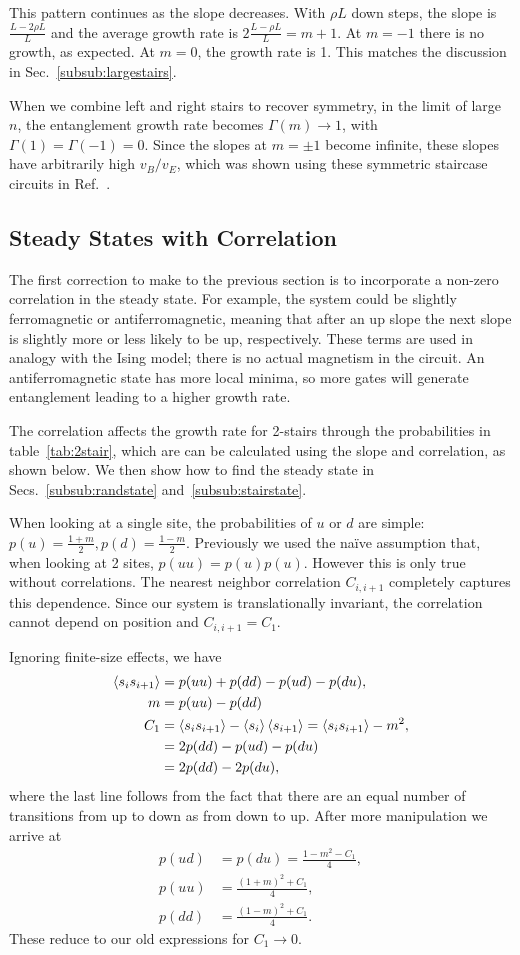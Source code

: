 This pattern continues as the slope decreases. With $\rho L$ down steps, the slope is $\frac{L-2\rho L}{L}$ and the average growth rate is $2\frac{L-\rho L}{L} = m+1$. At $m = -1$ there is no growth, as expected. At $m=0$, the growth rate is 1. This matches the discussion in Sec.~\ref{subsub:largestairs}.

When we combine left and right stairs to recover symmetry, in the limit of large $n$, the entanglement growth rate becomes $\Gamma(m)\to 1$, with $\Gamma(1) = \Gamma(-1)=0$. Since the slopes at $m=\pm1$ become infinite, these slopes have arbitrarily high $v_B/v_E$, which was shown using these symmetric staircase circuits in Ref.~\cite{Nahum2018}.

\subsection{Steady States with Correlation} \label{sub:steadystate}

The first correction to make to the previous section is to incorporate a non-zero correlation in the steady state. For example, the system could be slightly ferromagnetic or antiferromagnetic, meaning that after an up slope the next slope is slightly more or less likely to be up, respectively. These terms are used in analogy with the Ising model; there is no actual magnetism in the circuit. An antiferromagnetic state has more local minima, so more gates will generate entanglement leading to a higher growth rate.

The correlation affects the growth rate for 2-stairs through the probabilities in table~\ref{tab:2stair}, which are can be calculated using the slope and correlation, as shown below. We then show how to find the steady state in Secs.~\ref{subsub:randstate} and~\ref{subsub:stairstate}.

When looking at a single site, the probabilities of $u$ or $d$ are simple: $p(u) = \frac{1+m}{2}, p(d) = \frac{1-m}{2}$. Previously we used the na\"ive assumption that, when looking at 2 sites, $p(uu) = p(u)p(u)$. However this is only true without correlations. The nearest neighbor correlation $C_{i,i+1}$ completely captures this dependence. Since our system is translationally invariant, the correlation cannot depend on position and $C_{i,i+1}=C_1$.

Ignoring finite-size effects, we have
\begin{align}
\left\langle s_is_{i+1} \right\rangle &= p(uu) + p(dd) - p(ud) - p(du),\nonumber\\
m &= p(uu) - p(dd)\nonumber\\
C_{1} &= \left\langle s_is_{i+1} \right\rangle-\left\langle s_i \right\rangle\left\langle s_{i+1} \right\rangle = \left\langle s_is_{i+1} \right\rangle - m^2,\nonumber\\
&= 2p(dd) -p(ud) - p(du)\nonumber\\
&= 2p(dd) - 2p(du),
\end{align}
where the last line follows from the fact that there are an equal number of transitions from up to down as from down to up. After more manipulation we arrive at 
\begin{align}
p(ud) &= p(du) = \frac{1-m^2-C_1}{4},\\
p(uu) &= \frac{(1+m)^2+C_1}{4},\\
p(dd) &= \frac{(1-m)^2+C_1}{4}.
\end{align}
These reduce to our old expressions for $C_1\to0$.


